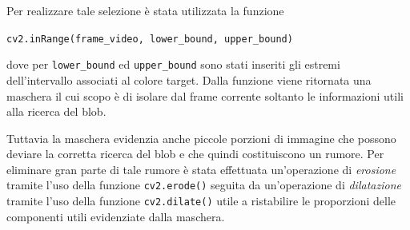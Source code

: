 Per realizzare tale selezione è stata utilizzata la funzione
\begin{center}
	\texttt{cv2.inRange(frame\_video, lower\_bound, upper\_bound)}
\end{center} 
dove per \texttt{lower\_bound} ed \texttt{upper\_bound} sono stati inseriti gli estremi dell'intervallo associati al colore target. Dalla funzione viene ritornata una maschera il cui scopo è di isolare dal frame corrente soltanto le informazioni utili alla ricerca del blob.

\begin{figure}[htbp]
	\begin{center}
	\end{center}
\end{figure}

Tuttavia la maschera evidenzia anche piccole porzioni di immagine che possono deviare la corretta ricerca del blob e che quindi costituiscono un rumore. Per eliminare gran parte di tale rumore è stata effettuata un'operazione di {\itshape erosione} tramite l'uso della funzione \texttt{cv2.erode()} seguita da un'operazione di {\itshape dilatazione} tramite l'uso della funzione \texttt{cv2.dilate()} utile a ristabilire le proporzioni delle componenti utili evidenziate dalla maschera.

\begin{figure}[htbp]
	\begin{center}
	\end{center}
\end{figure}

